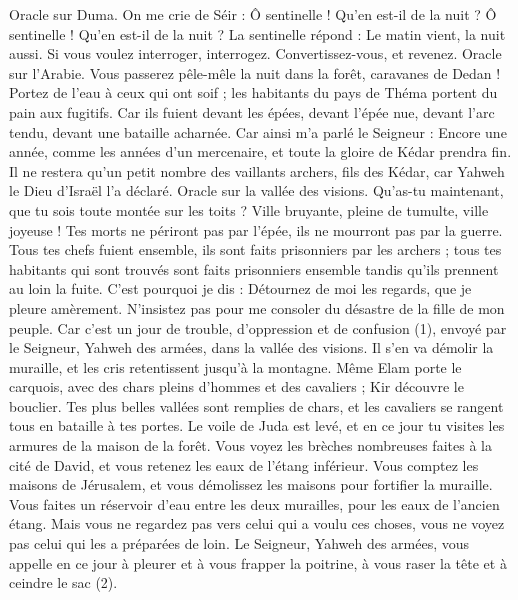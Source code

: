 \begin{multicols}{2}
Oracle sur Duma. On me crie de Séir : Ô sentinelle ! Qu’en est-il de la nuit ? Ô sentinelle ! Qu’en est-il de la nuit ?
La sentinelle répond : Le matin vient, la nuit aussi. Si vous voulez interroger, interrogez. Convertissez-vous, et revenez.
Oracle sur l'Arabie. Vous passerez pêle-mêle la nuit dans la forêt, caravanes de Dedan !
Portez de l’eau à ceux qui ont soif ; les habitants du pays de Théma portent du pain aux fugitifs.
Car ils fuient devant les épées, devant l'épée nue, devant l'arc tendu, devant une bataille acharnée.
Car ainsi m’a parlé le Seigneur : Encore une année, comme les années d’un mercenaire, et toute la gloire de Kédar prendra fin.
Il ne restera qu’un petit nombre des vaillants archers, fils des Kédar, car Yahweh le Dieu d'Israël l’a déclaré.
\VerseOne{}Oracle sur la vallée des visions. Qu'as-tu maintenant, que tu sois toute montée sur les toits ?
Ville bruyante, pleine de tumulte, ville joyeuse ! Tes morts ne périront pas par l'épée, ils ne mourront pas par la guerre.
Tous tes chefs fuient ensemble, ils sont faits prisonniers par les archers ; tous tes habitants qui sont trouvés sont faits prisonniers ensemble tandis qu’ils prennent au loin la fuite.
C'est pourquoi je dis : Détournez de moi les regards, que je pleure amèrement. N’insistez pas pour me consoler du désastre de la fille de mon peuple.
Car c'est un jour de trouble, d'oppression et de confusion (1), envoyé par le Seigneur, Yahweh des armées, dans la vallée des visions. Il s'en va démolir la muraille, et les cris retentissent jusqu'à la montagne.
Même Elam porte le carquois, avec des chars pleins d’hommes et des cavaliers ; Kir découvre le bouclier.
Tes plus belles vallées sont remplies de chars, et les cavaliers se rangent tous en bataille à tes portes.
Le voile de Juda est levé, et en ce jour tu visites les armures de la maison de la forêt.
Vous voyez les brèches nombreuses faites à la cité de David, et vous retenez les eaux de l’étang inférieur.
Vous comptez les maisons de Jérusalem, et vous démolissez les maisons pour fortifier la muraille.
Vous faites un réservoir d'eau entre les deux murailles, pour les eaux de l’ancien étang. Mais vous ne regardez pas vers celui qui a voulu ces choses, vous ne voyez pas celui qui les a préparées de loin.
Le Seigneur, Yahweh des armées, vous appelle en ce jour à pleurer et à vous frapper la poitrine, à vous raser la tête et à ceindre le sac (2).

\end{multicols}
